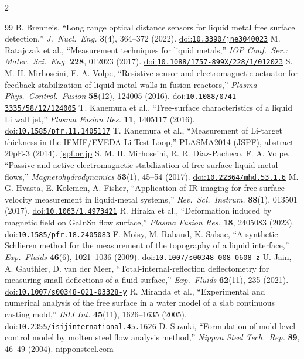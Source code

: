 \documentclass[10pt,letterpaper]{article}
\newcommand{\doi}[1]{\href{https://doi.org/#1}{doi:\nolinkurl{#1}}}
\begin{document}
\begin{multicols}{2}
\begin{thebibliography}{99}
 B. Brenneis, ``Long range optical distance sensors for liquid metal free surface detection,'' \emph{J.\ Nucl.\ Eng.} \textbf{3}(4), 364--372 (2022). \doi{10.3390/jne3040023}
 M. Ratajczak et al., ``Measurement techniques for liquid metals,'' \emph{IOP Conf.\ Ser.: Mater.\ Sci.\ Eng.} \textbf{228}, 012023 (2017). \doi{10.1088/1757-899X/228/1/012023}
 S. M. H. Mirhoseini, F. A. Volpe, ``Resistive sensor and electromagnetic actuator for feedback stabilization of liquid metal walls in fusion reactors,'' \emph{Plasma Phys.\ Control.\ Fusion} \textbf{58}(12), 124005 (2016). \doi{10.1088/0741-3335/58/12/124005}
 T. Kanemura et al., ``Free-surface characteristics of a liquid Li wall jet,'' \emph{Plasma Fusion Res.} \textbf{11}, 1405117 (2016). \doi{10.1585/pfr.11.1405117}
 T. Kanemura et al., ``Measurement of Li-target thickness in the IFMIF/EVEDA Li Test Loop,'' PLASMA2014 (JSPF), abstract 20pE-3 (2014). \href{https://www.jspf.or.jp/PLASMA2014/PLACON2014/pdf/20pE-3.pdf}{jspf.or.jp}
 S. M. H. Mirhoseini, R. R. Diaz-Pacheco, F. A. Volpe, ``Passive and active electromagnetic stabilization of free-surface liquid metal flows,'' \emph{Magnetohydrodynamics} \textbf{53}(1), 45--54 (2017). \doi{10.22364/mhd.53.1.6}
 M. G. Hvasta, E. Kolemen, A. Fisher, ``Application of IR imaging for free-surface velocity measurement in liquid-metal systems,'' \emph{Rev.\ Sci.\ Instrum.} \textbf{88}(1), 013501 (2017). \doi{10.1063/1.4973421}
 R. Hiraka et al., ``Deformation induced by magnetic field on GaInSn flow surface,'' \emph{Plasma Fusion Res.} \textbf{18}, 2405083 (2023). \doi{10.1585/pfr.18.2405083}
 F. Moisy, M. Rabaud, K. Salsac, ``A synthetic Schlieren method for the measurement of the topography of a liquid interface,'' \emph{Exp.\ Fluids} \textbf{46}(6), 1021--1036 (2009). \doi{10.1007/s00348-008-0608-z}
 U. Jain, A. Gauthier, D. van der Meer, ``Total-internal-reflection deflectometry for measuring small deflections of a fluid surface,'' \emph{Exp.\ Fluids} \textbf{62}(11), 235 (2021). \doi{10.1007/s00348-021-03328-y}
 R. Miranda et al., ``Experimental and numerical analysis of the free surface in a water model of a slab continuous casting mold,'' \emph{ISIJ Int.} \textbf{45}(11), 1626--1635 (2005). \doi{10.2355/isijinternational.45.1626}
 D. Suzuki, ``Formulation of mold level control model by molten steel flow analysis method,'' \emph{Nippon Steel Tech.\ Rep.} \textbf{89}, 46--49 (2004). \href{https://www.nipponsteel.com/en/tech/report/nsc/pdf/n8910.pdf}{nipponsteel.com}

\end{thebibliography}
\end{multicols}
\end{document}

